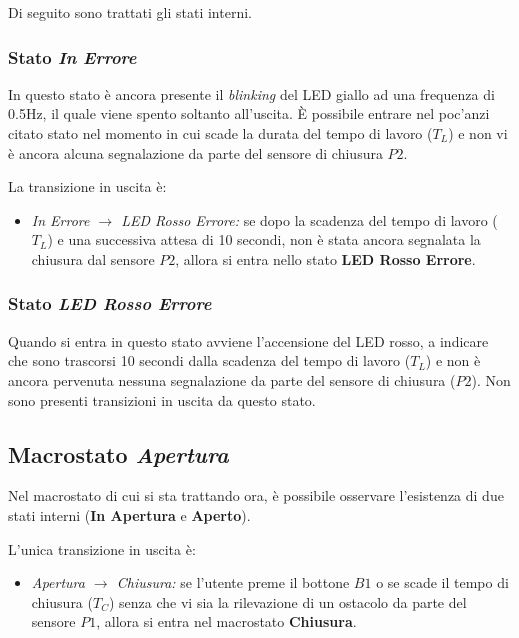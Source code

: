     \noindent Di seguito sono trattati gli stati interni.
        
    \subsubsection{Stato \textit{In Errore}}
        In questo stato è ancora presente il \textit{blinking} del LED giallo ad una frequenza di 0.5Hz, il quale viene spento soltanto all'uscita. È possibile entrare nel poc'anzi citato stato nel momento in cui scade la durata del tempo di lavoro ($T_L$) e non vi è ancora alcuna segnalazione da parte del sensore di chiusura $P2$.
        
        \noindent La transizione in uscita è:
        \begin{itemize}
            \item \textit{In Errore $\rightarrow$ LED Rosso Errore:} se dopo la scadenza del tempo di lavoro ($T_L$) e una successiva attesa di 10 secondi, non è stata ancora segnalata la chiusura dal sensore $P2$, allora si entra nello stato \textbf{LED Rosso Errore}.
        \end{itemize}

    \subsubsection{Stato \textit{LED Rosso Errore}}
        Quando si entra in questo stato avviene l'accensione del LED rosso, a indicare che sono trascorsi 10 secondi dalla scadenza del tempo di lavoro ($T_L$) e non è ancora pervenuta nessuna segnalazione da parte del sensore di chiusura ($P2$).
        Non sono presenti transizioni in uscita da questo stato.

\subsection{Macrostato \textit{Apertura}}
    Nel macrostato di cui si sta trattando ora, è possibile osservare l'esistenza di due stati interni (\textbf{In Apertura} e \textbf{Aperto}).
    
    \noindent L'unica transizione in uscita è:
    \begin{itemize}
        \item \textit{Apertura $\rightarrow$ Chiusura:} se l'utente preme il bottone $B1$ o se scade il tempo di chiusura ($T_C$) senza che vi sia la rilevazione di un ostacolo da parte del sensore $P1$, allora si entra nel macrostato \textbf{Chiusura}.
    \end{itemize}

